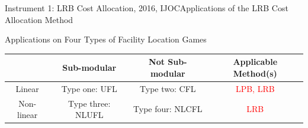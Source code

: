 \documentclass[14pt]{beamer}
\begin{document}
\begin{frame}{Instrument 1: LRB Cost Allocation, {\footnotesize 2016, IJOC}}{Applications of the LRB Cost Allocation Method}
\small
\begin{shaded}
\centering
Applications on Four Types of Facility Location Games
\end{shaded}
\begin{table}[H]
\centering
\tabcolsep=2pt
\footnotesize
\renewcommand\arraystretch{2}
\begin{tabular}[!h]{c| c c| c}

\multicolumn{1}{c|}{} &\multicolumn{1}{c}{Sub-modular} & \multicolumn{1}{c}{Not Sub-modular}& \multicolumn{1}{|c}{Applicable Method(s)}\\
\hline
Linear	&Type one: UFL	&Type two: CFL	&\textcolor{red}{LPB, LRB}\\

Non-linear	&Type three: NLUFL	&Type four: NLCFL	&\textcolor{red}{LRB}\\
\end{tabular}
\end{table}

\end{frame}
\end{document}
